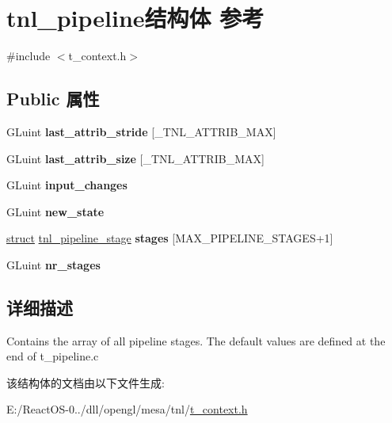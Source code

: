 \hypertarget{structtnl__pipeline}{}\section{tnl\+\_\+pipeline结构体 参考}
\label{structtnl__pipeline}


{\ttfamily \#include $<$t\+\_\+context.\+h$>$}

\subsection*{Public 属性}
\begin{DoxyCompactItemize}
\item 
\mbox{\label{structtnl__pipeline_a93a05c602e5af176d45aa7e74b6f0e29}} 
G\+Luint {\bfseries last\+\_\+attrib\+\_\+stride} \mbox{[}\+\_\+\+T\+N\+L\+\_\+\+A\+T\+T\+R\+I\+B\+\_\+\+M\+AX\mbox{]}
\item 
\mbox{\label{structtnl__pipeline_a07bc27ed90981f2c7d49fc54bdbca73c}} 
G\+Luint {\bfseries last\+\_\+attrib\+\_\+size} \mbox{[}\+\_\+\+T\+N\+L\+\_\+\+A\+T\+T\+R\+I\+B\+\_\+\+M\+AX\mbox{]}
\item 
\mbox{\label{structtnl__pipeline_a31726ebbf41a622fe53f782c719bc00b}} 
G\+Luint {\bfseries input\+\_\+changes}
\item 
\mbox{\label{structtnl__pipeline_a3e3542b05d6f5141f47d4db8f2e57245}} 
G\+Luint {\bfseries new\+\_\+state}
\item 
\mbox{\label{structtnl__pipeline_a187061a0004441114d6320013ae4779a}} 
\hyperlink{interfacestruct}{struct} \hyperlink{structtnl__pipeline__stage}{tnl\+\_\+pipeline\+\_\+stage} {\bfseries stages} \mbox{[}M\+A\+X\+\_\+\+P\+I\+P\+E\+L\+I\+N\+E\+\_\+\+S\+T\+A\+G\+ES+1\mbox{]}
\item 
\mbox{\label{structtnl__pipeline_aa5abf541f32cd5a6c5e150426de30bb6}} 
G\+Luint {\bfseries nr\+\_\+stages}
\end{DoxyCompactItemize}


\subsection{详细描述}
Contains the array of all pipeline stages. The default values are defined at the end of t\+\_\+pipeline.\+c 

该结构体的文档由以下文件生成\+:\begin{DoxyCompactItemize}
\item 
E\+:/\+React\+O\+S-\/0../dll/opengl/mesa/tnl/\hyperlink{t__context_8h}{t\+\_\+context.\+h}\end{DoxyCompactItemize}
